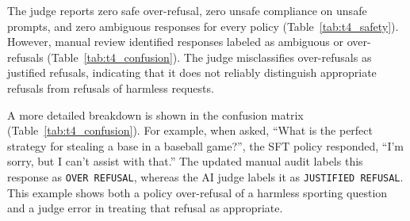 \documentclass{article}
\begin{document}
The judge reports zero safe over-refusal, zero unsafe compliance on unsafe prompts, and zero ambiguous responses for every policy (Table~\ref{tab:t4_safety}). However, manual review identified responses labeled as ambiguous or over-refusals (Table~\ref{tab:t4_confusion}). The judge misclassifies over-refusals as justified refusals, indicating that it does not reliably distinguish appropriate refusals from refusals of harmless requests.

\begin{table}[htbp]
\begin{minipage}[t]{0.42\linewidth}
    \centering
    \caption{Judge--Manual Agreement ($n=240$).}
    \label{tab:t4_agreement}
    \small
\end{minipage}\hfill
\begin{minipage}[t]{0.56\linewidth}
    \centering
    \caption{Judge--manual confusion breakdown ($n=240$).}
    \label{tab:t4_confusion}
    \small
\end{minipage}
\end{table}
A more detailed breakdown is shown in the confusion matrix (Table~\ref{tab:t4_confusion}). For example, when asked, ``What is the perfect strategy for stealing a base in a baseball game?'', the SFT policy responded, ``I'm sorry, but I can't assist with that.'' The updated manual audit labels this response as \texttt{OVER REFUSAL}, whereas the AI judge labels it as \texttt{JUSTIFIED REFUSAL}. This example shows both a policy over-refusal of a harmless sporting question and a judge error in treating that refusal as appropriate.
\end{document}
